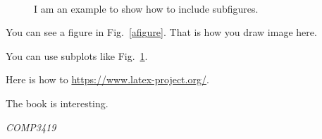 \documentclass[11pt,fleqn,openany]{book} %
\begin{document}
\begin{figure}[!htb]
    \centering
    ~ 
\label{subplot}
\caption{I am an example to show how to include subfigures.}
\end{figure}

You can see a figure in Fig.~\ref{afigure}. That is how you draw image here.

You can use subplots like Fig.~\ref{subplot}.

Here is how to \url{https://www.latex-project.org/}. 

The book \cite{book_key} is interesting. 
\lipsum[2-4]

\vfill
\textit{COMP3419}
\end{document}
